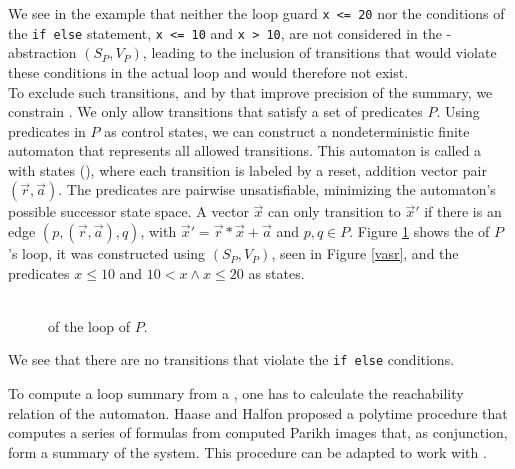 
\begin{comment}
	\jw{Introduction qvasrs $\rightarrow$ summary precision improvement \\
	- What are qvasr? How to compute their reachability relation $\rightarrow$ Parikh image? \\ 
	How do they improve precision? \\
	- running example to qvasrs \\
	\vspace{1cm}
	15 pages}
\end{comment}


We see in the example that neither the loop guard \texttt{x <= 20} nor the conditions of the \texttt{if else} statement, \texttt{x <= 10} and \texttt{x > 10}, are not considered in the \qvasr-abstraction $(S_P, V_P)$, leading to the inclusion of transitions that would violate these conditions in the actual loop and would therefore not exist. \\
To exclude such transitions, and by that improve precision of the summary, we constrain \qvasr. We only allow transitions that satisfy a set of predicates $P$. Using predicates in $P$ as control states, we can construct a nondeterministic finite automaton that represents all allowed transitions. This automaton is called a \qvasr with states (\qvasrs), where each transition is labeled by a reset, addition vector pair $(\vec{r}, \vec{a})$. The predicates are pairwise unsatisfiable, minimizing the automaton's possible successor state space. A vector $\vec{x}$ can only transition to $\vec{x}'$ if there is an edge $(p, (\vec{r}, \vec{a}), q)$, with $\vec{x}' = \vec{r} * \vec{x} + \vec{a}$ and $p, q \in P$.
Figure \ref{vasrs} shows the \qvasrs of $P$'s loop, it was constructed using $(S_P, V_P)$, seen in Figure \ref{vasr}, and the predicates $x \leq 10$ and $10 < x \land x \leq 20$ as states.
\begin{figure}[H]
	
	\caption{\\ \qvasrs of the loop of $P$.}
	\label{vasrs}
\end{figure}
We see that there are no transitions that violate the \texttt{if else} conditions. \par
To compute a loop summary from a \qvasrs, one has to calculate the reachability relation of the automaton. Haase and Halfon \cite{DBLP:conf/rp/HaaseH14} proposed a polytime procedure that computes a series of formulas from computed Parikh images that, as conjunction, form a summary of the system. This procedure can be adapted to work with \qvasrs. \\ \par